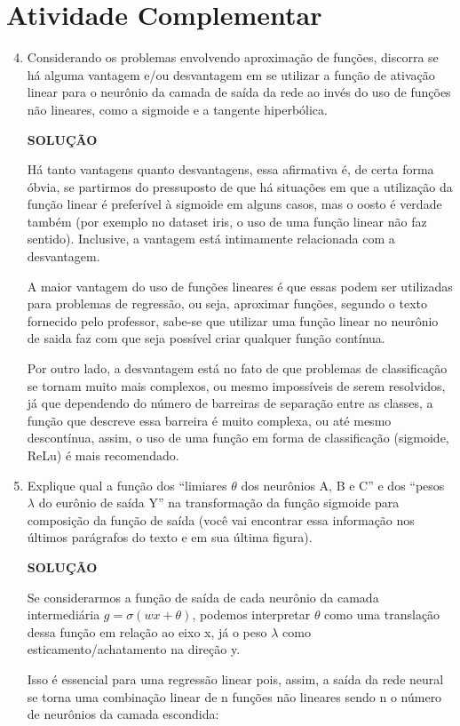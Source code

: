 \documentclass[a4paper, 12pt]{article}
\newcommand{\solucao}{
\begin{center}
\textbf{SOLUÇÃO}
\end{center}}
\begin{document}
\section{Atividade Complementar}
\begin{enumerate}
\setcounter{enumi}{3}
\item Considerando os problemas envolvendo aproximação de funções, discorra se há alguma vantagem e/ou desvantagem em se utilizar a função de ativação linear para o neurônio da camada de saída da rede ao invés do uso de funções não lineares, como a sigmoide e a tangente hiperbólica.

\solucao

Há tanto vantagens quanto desvantagens, essa afirmativa é, de certa forma óbvia, se partirmos do pressuposto de que há situações em que a utilização da função linear é preferível à sigmoide em alguns casos, mas o oosto é verdade também (por exemplo no dataset iris, o uso de uma função linear não faz sentido). Inclusive, a vantagem está intimamente relacionada com a desvantagem.

A maior vantagem do uso de funções lineares é que essas podem ser utilizadas para problemas de regressão, ou seja, aproximar funções, segundo o texto fornecido pelo professor, sabe-se que utilizar uma função linear no neurônio de saida faz com que seja possível criar qualquer função contínua.

Por outro lado, a desvantagem está no fato de que problemas de classificação se tornam muito mais complexos, ou mesmo impossíveis de serem resolvidos, já que dependendo do número de barreiras de separação entre as classes, a função que descreve essa barreira é muito complexa, ou até mesmo descontínua, assim, o uso de uma função em forma de classificação (sigmoide, ReLu) é mais recomendado.

\item Explique qual a função dos “limiares {$\theta$} dos neurônios A, B e C” e dos “pesos $\lambda$ do eurônio de saída Y” na transformação da função sigmoide para composição da função de saída (você vai encontrar essa informação nos últimos parágrafos do texto e em sua última figura).

\solucao

Se considerarmos a função de saída de cada neurônio da camada intermediária $g = \sigma(wx + \theta)$, podemos interpretar $\theta$ como uma translação dessa função em relação ao eixo x, já o peso $\lambda$ como esticamento/achatamento na direção y.

Isso é essencial para uma regressão linear pois, assim, a saída da rede neural se torna uma combinação linear de n funções não lineares sendo n o número de neurônios da camada escondida:


\end{enumerate}
\end{document}
